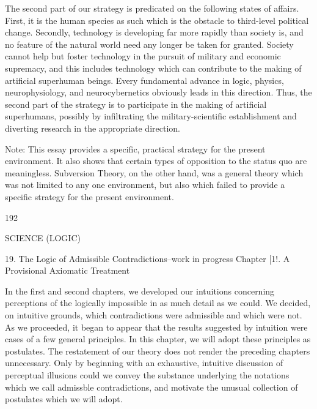 \documentclass[10pt,twoside]{memoir}
\begin{document}
\begin{enumerate}
{\begin{enumerate}
\begin{sysrules}
\begin{sysrules}
\begin{sysrules}
\begin{sysrules}
{\begin{enumerate}
{{{{{{{{{The second part of our strategy is predicated on the following states of 
affairs. First, it is the human species as such which is the obstacle to 
third-level political change. Secondly, technology is developing far more 
rapidly than society is, and no feature of the natural world need any longer 
be taken for granted. Society cannot help but foster technology in the 
pursuit of military and economic supremacy, and this includes technology 
which can contribute to the making of artificial superhuman beings. Every 
fundamental advance in logic, physics, neurophysiology, and 
neurocybernetics obviously leads in this direction. Thus, the second part of 
the strategy is to participate in the making of artificial superhumans, 
possibly by infiltrating the military-scientific establishment and diverting 
research in the appropriate direction. 


Note: This essay provides a specific, practical strategy for the present 
environment. It also shows that certain types of opposition to the status quo 
are meaningless. Subversion Theory, on the other hand, was a general theory 
which was not limited to any one environment, but also which failed to 
provide a specific strategy for the present environment. 


192 


SCIENCE (LOGIC) 


19. The Logic of Admissible Contradictions--work in progress 
Chapter [1!. A Provisional Axiomatic Treatment 


In the first and second chapters, we developed our intuitions 
concerning perceptions of the logically impossible in as much detail as we 
could. We decided, on intuitive grounds, which contradictions were 
admissible and which were not. As we proceeded, it began to appear that the 
results suggested by intuition were cases of a few general principles. In this 
chapter, we will adopt these principles as postulates. The restatement of our 
theory does not render the preceding chapters unnecessary. Only by 
beginning with an exhaustive, intuitive discussion of perceptual illusions 
could we convey the substance underlying the notations which we call 
admissble contradictions, and motivate the unusual collection of postulates 
which we will adopt. 

}}}}}}}}}
\end{enumerate}}
\end{sysrules}
\end{sysrules}
\end{sysrules}
\end{sysrules}
\end{enumerate}}
\end{enumerate}
\end{document}
